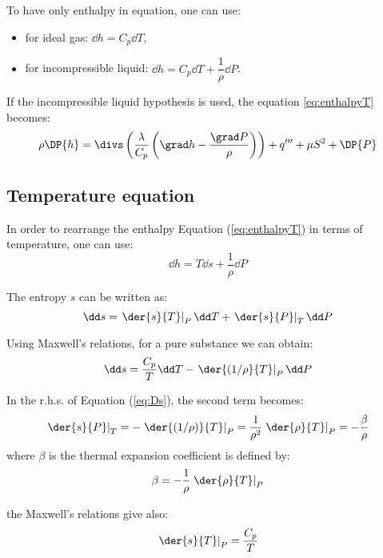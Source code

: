 To have only enthalpy in equation, one can use:
\begin{itemize}
 \item for ideal gas: $\displaystyle \dd h=C_p \dd T$,
 \item for incompressible liquid: $\displaystyle \dd h=C_p \dd T + \dfrac{1}{\rho} \dd P$.
\end{itemize}

If the incompressible liquid hypothesis is used, the equation \ref{eq:enthalpyT} becomes:
\begin{equation}
 \rho \DP{h} = \divs \left( \dfrac{\lambda}{C_p} \left(\grad h -\frac{\grad P}{\rho}\right)\right) +q''' + \mu S^2 + \DP{P} 
\label{eq:enthalpyH}
\end{equation}

\subsection{Temperature equation}

In order to rearrange the enthalpy Equation (\ref{eq:enthalpyT}) in terms of temperature, one can use:
\begin{equation}
 \dd h = T \dd s + \frac{1}{\rho} \dd P
\end{equation}

The entropy $s$ can be written as:
\begin{equation}
 \dd s = \left.\der{s}{T}\right|_P \dd T + \left.\der{s}{P}\right|_T \dd P
\label{eq:Ds}
\end{equation}

Using Maxwell's relations, for a pure substance we can obtain:
\begin{equation}
 \dd s = \frac{C_p}{T} \dd T - \left.\der{(1/\rho}{T}\right|_P  \dd P
\label{eq:Ds_maxwell}
\end{equation}

In the r.h.s. of Equation (\ref{eq:Ds}), the second term becomes:
\begin{equation}
 \left.\der{s}{P}\right|_T = -  \left.\der{(1/\rho)}{T}\right|_P = \frac{1}{\rho^2} \left.\der{\rho}{T}\right|_P=-\frac{\beta}{\rho}
\end{equation}
where $\beta$ is the thermal expansion coefficient is defined by:
\begin{equation}
 \beta= -\frac{1}{\rho}  \left.\der{\rho}{T}\right|_P
\end{equation}

the Maxwell's relations give also:
\begin{equation}
 \left.\der{s}{T}\right|_P= \frac{C_p}{T}
\end{equation}


